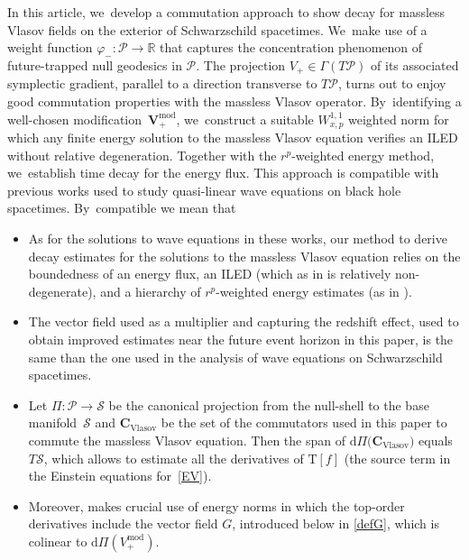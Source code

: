 \documentclass[10pt]{amsart}
\theoremstyle{plain}
\theoremstyle{definition}
\newcommand\R{{\mathbb{R}}}
\begin{document}
In this article, we~develop a commutation approach to show decay for massless Vlasov fields on the exterior of Schwarzschild spacetimes. We~make use of a weight function $\varphi_-\colon \mathcal{P}\to \R$ that captures the concentration phenomenon of future-trapped null geodesics in $\mathcal{P}$. The projection $V_+\in \Gamma(T\mathcal{P})$ of its associated symplectic gradient, parallel to a direction transverse to $T\mathcal{P}$, turns out to enjoy good commutation properties with the massless Vlasov operator. By~identifying a well-chosen modification~$\pmb{V}_+^{\mathrm{mod}}$, we~construct a suitable $W_{x,p}^{1,1}$ weighted norm for which any finite energy solution to the massless Vlasov equation verifies an ILED without relative degeneration. Together with the $r^p$-weighted energy method, we~establish time decay for the energy flux. This approach is compatible with previous works \cite{Mavq,DHRTq,DHRTq2} used to study quasi-linear wave equations on black hole spacetimes. By~compatible we mean that
\begin{itemize}
\item As for the solutions to wave equations in these works, our method to derive decay estimates for the solutions to the massless Vlasov equation relies on the boundedness of an energy flux, an ILED (which as in \cite{Mavq} is relatively non-degenerate), and a hierarchy of $r^p$-weighted energy estimates (as in \cite{DHRTq, DHRTq2}).
\item The vector field used as a multiplier and capturing the redshift effect, used to obtain improved estimates near the future event horizon in this paper, is the same than the one used in the analysis of wave equations on Schwarzschild spacetimes.
\item Let $\Pi \colon \mathcal{P} \to \mathcal{S}$ be the canonical projection from the null-shell to the base manifold~$\mathcal{S}$ and $\mathbf{C}_{\mathrm{Vlasov}}$ be the set of the commutators used in this paper to commute the massless Vlasov equation. Then the span of $\mathrm{d} \Pi \bigl( \mathbf{C}_{\mathrm{Vlasov}} \bigr) $ equals $T\mathcal{S}$, which allows to estimate all the derivatives of $\mathrm{T}[f]$ (the source term in the Einstein equations for~\eqref{EV}).
\item Moreover, \cite{Mavq} makes crucial use of energy norms in which the top-order derivatives include the vector field $G$, introduced below in \eqref{defG}, which is colinear to $\mathrm{d} \Pi (V_+^{\mathrm{mod}})$.
\end{itemize}
\end{document}

